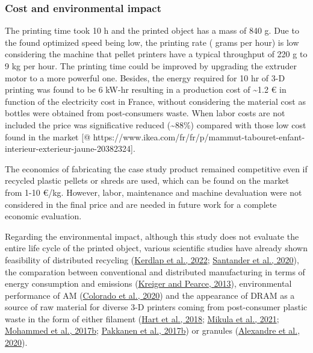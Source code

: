 \documentclass[
  12pt,
  number,
  review]{elsarticle}
\begin{document}
\hypertarget{cost-and-environmental-impact}{%
\subsubsection{Cost and environmental
impact}\label{cost-and-environmental-impact}}

The printing time took 10 h and the printed object has a mass of 840 g.
Due to the found optimized speed being low, the printing rate ( grams
per hour) is low considering the machine that pellet printers have a
typical throughput of 220 g to 9 kg per hour. The printing time could be
improved by upgrading the extruder motor to a more powerful one.
Besides, the energy required for 10 hr of 3-D printing was found to be 6
kW-hr resulting in a production cost of \textasciitilde1.2 € in function
of the electricity cost in France, without considering the material cost
as bottles were obtained from post-consumers waste. When labor costs are
not included the price was significative reduced (\textasciitilde88\%)
compared with those low cost found in the market {[}@
https://www.ikea.com/fr/fr/p/mammut-tabouret-enfant-interieur-exterieur-jaune-20382324{]}.

The economics of fabricating the case study product remained competitive
even if recycled plastic pellets or shreds are used, which can be found
on the market from 1-10 €/kg. However, labor, maintenance and machine
devaluation were not considered in the final price and are needed in
future work for a complete economic evaluation.

Regarding the environmental impact, although this study does not
evaluate the entire life cycle of the printed object, various scientific
studies have already shown feasibility of distributed recycling
(\protect\hyperlink{ref-kerdlap2022}{Kerdlap et al., 2022};
\protect\hyperlink{ref-santander2020}{Santander et al., 2020}), the
comparation between conventional and distributed manufacturing in terms
of energy consumption and emissions
(\protect\hyperlink{ref-Kreiger2013}{Kreiger and Pearce, 2013}),
environmental performance of AM
(\protect\hyperlink{ref-colorado2020a}{Colorado et al., 2020}) and the
appearance of DRAM as a source of raw material for diverse 3-D printers
coming from post-consumer plastic waste in the form of either filament
(\protect\hyperlink{ref-hart2018}{Hart et al., 2018};
\protect\hyperlink{ref-mikula2021}{Mikula et al., 2021};
\protect\hyperlink{ref-mohammed2017a}{Mohammed et al., 2017b};
\protect\hyperlink{ref-pakkanen2017}{Pakkanen et al., 2017b}) or
granules (\protect\hyperlink{ref-alexandre2020}{Alexandre et al.,
2020}).
\end{document}

